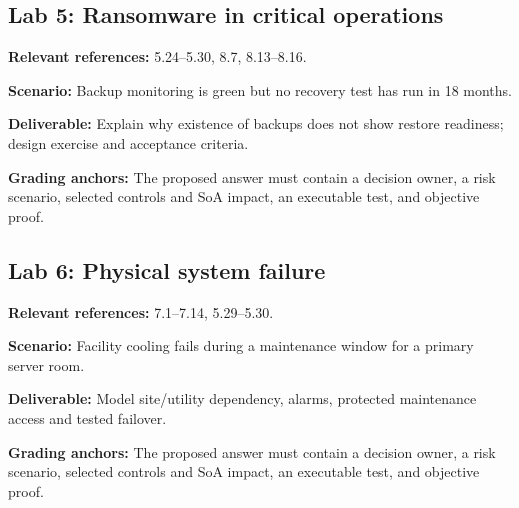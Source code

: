 \documentclass[11pt,letterpaper]{article}
\begin{document}
\subsection{Lab 5: Ransomware in critical operations}
\textbf{Relevant references:} 5.24--5.30, 8.7, 8.13--8.16.\par\textbf{Scenario:} Backup monitoring is green but no recovery test has run in 18 months.\par\textbf{Deliverable:} Explain why existence of backups does not show restore readiness; design exercise and acceptance criteria.\par\textbf{Grading anchors:} The proposed answer must contain a decision owner, a risk scenario, selected controls and SoA impact, an executable test, and objective proof.\par
\subsection{Lab 6: Physical system failure}
\textbf{Relevant references:} 7.1--7.14, 5.29--5.30.\par\textbf{Scenario:} Facility cooling fails during a maintenance window for a primary server room.\par\textbf{Deliverable:} Model site/utility dependency, alarms, protected maintenance access and tested failover.\par\textbf{Grading anchors:} The proposed answer must contain a decision owner, a risk scenario, selected controls and SoA impact, an executable test, and objective proof.\par
\end{document}
